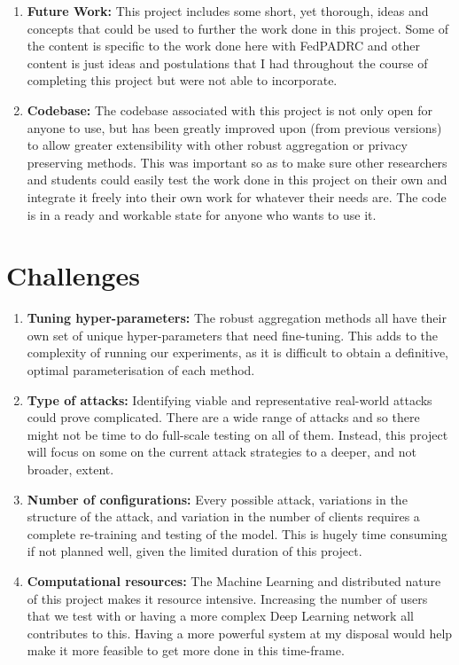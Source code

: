 \begin{enumerate}
    \item \textbf{Future Work:}
    This project includes some short, yet thorough, ideas and concepts that could be used to further the work done in this project.
    Some of the content is specific to the work done here with FedPADRC and other content is just ideas and postulations that I had throughout the course of completing this project but were not able to incorporate.
    
    \item \textbf{Codebase:}
    The codebase associated with this project is not only open for anyone to use, but has been greatly improved upon (from previous versions) to allow greater extensibility with other robust aggregation or privacy preserving methods.
    This was important so as to make sure other researchers and students could easily test the work done in this project on their own and integrate it freely into their own work for whatever their needs are.
    The code is in a ready and workable state for anyone who wants to use it.
        
\end{enumerate}


\section{Challenges}
\begin{enumerate}
    \item \textbf{Tuning hyper-parameters:} 
    The robust aggregation methods all have their own set of unique hyper-parameters that need fine-tuning. This adds to the complexity of running our experiments, as it is difficult to obtain a definitive, optimal parameterisation of each method.
        
    \item \textbf{Type of attacks:} 
    Identifying viable and representative real-world attacks could prove complicated. 
    There are a wide range of attacks and so there might not be time to do full-scale testing on all of them.
    Instead, this project will focus on some on the current attack strategies to a deeper, and not broader, extent.

    \item \textbf{Number of configurations:}  
    Every possible attack, variations in the structure of the attack, and variation in the number of clients requires a complete re-training and testing of the model. 
    This is hugely time consuming if not planned well, given the limited duration of this project.
    
    \item \textbf{Computational resources:}
    The Machine Learning and distributed nature of this project makes it resource intensive. 
    Increasing the number of users that we test with or having a more complex Deep Learning network all contributes to this.
    Having a more powerful system at my disposal would help make it more feasible to get more done in this time-frame.
\end{enumerate}

